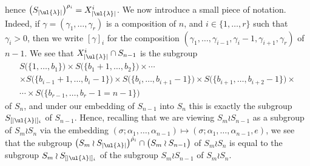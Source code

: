 hence $\bigl(S_{|\ul{\lambda}|}\bigr)^{\rho_i} = X^i_{|\ul{\lambda}|}$.
We now introduce a small piece of notation.
Indeed, if $\gamma = (\gamma_1,\ldots,\gamma_r)$ is a composition of $n$, and $i \in \{1,\ldots,r\}$ such that $\gamma_i > 0$, then we
write $[\gamma]_i$ for the composition $(\gamma_1,\ldots,\gamma_{i-1},\gamma_i -1, \gamma_{i+1},\gamma_r)$ of $n-1$.
We see that $X^i_{|\ul{\lambda}|}\cap S_{n-1}$ is the subgroup
\begin{multline*}
S\bigl(\{1,\ldots,b_1\}\bigr) \times S\bigl(\{b_1+1,\ldots,b_2\}\bigr) \times \cdots\\
\times S\bigl(\{b_{i-1}+1,\ldots,b_i-1\}\bigr)\times S\bigl(\{b_i,\ldots,b_{i+1}-1\}\bigr)\times S\bigl(\{b_{i+1},\ldots,b_{i+2}-1\}\bigr)
\times\\
\cdots \times S\bigl(\{b_{r-1},\ldots,b_r-1 =n-1\}\bigr)
\end{multline*}
of $S_n$, and under our embedding of $S_{n-1}$ into $S_n$
this is exactly the subgroup $S_{[|\ul{\lambda}|]_i}$ of $S_{n-1}$.
Hence, recalling that we are viewing $S_m \wr S_{n-1}$ as a subgroup
of $S_m \wr S_n$ via the embedding $(\sigma;\alpha_1,\ldots,\alpha_{n-1}) \longmapsto (\sigma;\alpha_1,\ldots,\alpha_{n-1},e)$, we see that
the subgroup $\bigl(S_m \wr S_{|\ul{\lambda}|}\bigr)^{\hat\rho_i}\cap\bigl(S_m \wr S_{n-1}\bigr)$ of $S_m \wr S_n$ is equal to the subgroup
$S_m \wr S_{[|\ul{\lambda}|]_i}$ of the subgroup $S_m \wr S_{n-1}$ of $S_m \wr S_n$.

